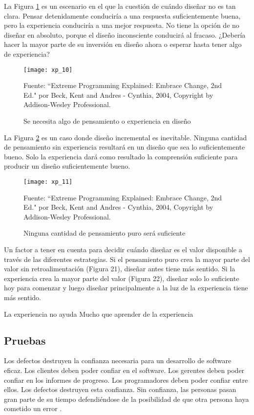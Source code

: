 \begin{spacing}{1.5}
				La Figura \ref{figure:chaperII_11} es un escenario en el que la cuestión de cuándo diseñar no es tan clara. Pensar detenidamente conduciría a una respuesta suficientemente buena, pero la experiencia conduciría a una mejor respuesta. No tiene la opción de no diseñar en absoluto, porque el diseño inconsciente conducirá al fracaso. ¿Debería hacer la mayor parte de su inversión en diseño ahora o esperar hasta tener algo de experiencia?
				
				\begin{figure}[H]
					\centering
					\texttt{[image: xp\_10]}
					\caption {\centering \small{Se necesita algo de pensamiento o experiencia en diseño}} \label{figure:chaperII_11}
					\small {Fuente: ``Extreme Programming Explained: Embrace Change, 2nd Ed." por Beck, Kent and Andres - Cynthia, 2004, Copyright by Addison-Wesley Professional.}
				\end{figure}
				
				La Figura \ref{figure:chaperII_12} es un caso donde diseño incremental es inevitable. Ninguna cantidad de pensamiento sin experiencia resultará en un diseño que sea lo suficientemente bueno. Solo la experiencia dará como resultado la comprensión suficiente para producir un diseño suficientemente bueno.
				
				\begin{figure}[H]
					\centering
					\texttt{[image: xp\_11]}
					\caption {\centering \small{Ninguna cantidad de pensamiento puro será suficiente}} \label{figure:chaperII_12}
					\small {Fuente: ``Extreme Programming Explained: Embrace Change, 2nd Ed." por Beck, Kent and Andres - Cynthia, 2004, Copyright by Addison-Wesley Professional.}
				\end{figure}
								
				Un factor a tener en cuenta para decidir cuándo diseñar es el valor disponible a través de las diferentes estrategias. Si el pensamiento puro crea la mayor parte del valor sin retroalimentación (Figura 21), diseñar antes tiene más sentido. Si la experiencia crea la mayor parte del valor (Figura 22), diseñar solo lo suficiente hoy para comenzar y luego diseñar principalmente a la luz de la experiencia tiene más sentido.
				
				La experiencia no ayuda
				Mucho que aprender de la experiencia
				
	\subsection{Pruebas}
				Los defectos destruyen la confianza necesaria para un desarrollo de software eficaz. Los clientes deben poder confiar en el software. Los gerentes deben poder confiar en los informes de progreso. Los programadores deben poder confiar entre ellos. Los defectos destruyen esta confianza. Sin confianza, las personas pasan gran parte de su tiempo defendiéndose de la posibilidad de que otra persona haya cometido un error \cite{chap2_extreme_programming}.
				

\end{spacing}
